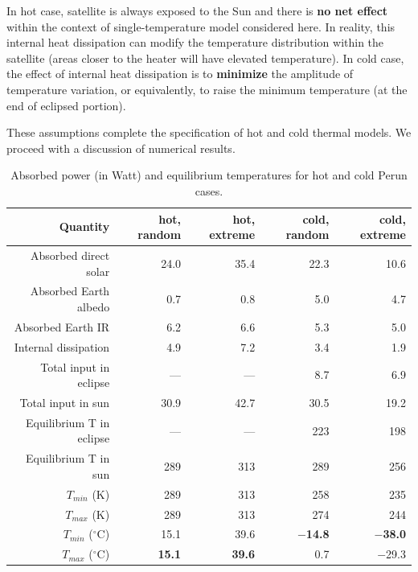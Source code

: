 \documentclass[]{aastex62}
\begin{document}
In hot case, satellite is always exposed to the Sun and there is {\bf no net effect} within the context
of single-temperature model considered here. In reality,  this
internal heat dissipation can modify the temperature distribution within the satellite (areas closer
to the heater will have elevated temperature). In cold case, the effect of internal heat dissipation
is to {\bf minimize} the amplitude of temperature variation, or equivalently, to raise the minimum
temperature (at the end of eclipsed portion). 
 
These assumptions complete the specification of hot and cold thermal models. We proceed
with a discussion of numerical results. 

\begin{table}[t]
	\centering
	\caption{Absorbed power (in Watt) and equilibrium temperatures for hot and cold Perun cases. }
	\label{tab:powertemp}
	\begin{tabular}{r|r|r|r|r} %
		\hline
  	                    Quantity          & hot, random   &  hot, extreme &   cold, random  & cold, extreme   \\
		\hline
           Absorbed direct solar         &  24.0        &  35.4     &  22.3         &  10.6      \\
           Absorbed Earth albedo       &    0.7        &    0.8   &     5.0           &  4.7      \\    
               Absorbed Earth IR           &    6.2        &    6.6     &     5.3        &  5.0     \\
             Internal dissipation           &    4.9        &   7.2     &     3.4         &  1.9     \\
		\hline 
             Total input in eclipse       &     ---      &   ---   &     8.7       &    6.9  \\
              Total input in sun            &    30.9      &   42.7  &   30.5        &  19.2  \\
		\hline
              Equilibrium T in eclipse  &     ---     &    ---   &    223       &   198 \\
              Equilibrium T in sun       &      289      &   313   &    289        &  256  \\
 		\hline
                    $T_{min}$  (K)               &      289      &   313   &   258       &  235  \\
                   $T_{max}$  (K)               &      289      &   313   &   274        &  244  \\
		\hline
                    $T_{min}$  ($^\circ$C)   &       15.1         &  39.6             &  {\bf   $-$14.8  }  &  {\bf  $-$38.0}  \\
                   $T_{max}$  ($^\circ$C)    &  {\bf  15.1  }  &    {\bf  39.6}  &        0.7      &  $-$29.3   \\
		\hline
	\end{tabular} 
\end{table}
\end{document}
